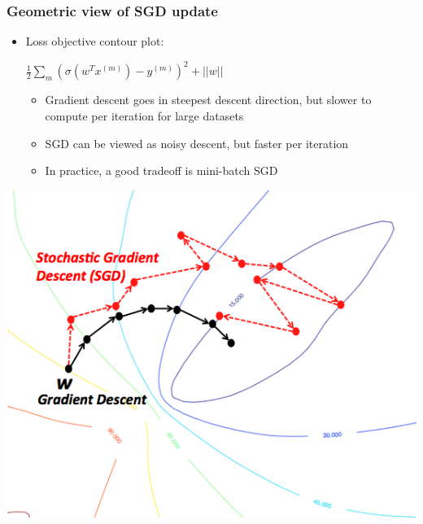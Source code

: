 \documentclass{beamer}
\newcommand{\bi}{\begin{itemize}}
\newcommand{\ei}{\end{itemize}}
\begin{document}
\begin{frame}
\frametitle{Geometric view of SGD update}
\bi
\item Loss objective contour plot: \begin{small}$\frac{1}{2} \sum_{m}  ( \sigma(w^T x^{(m)}) - y^{(m)} )^2 + ||w||$\end{small}
\bi
	\item Gradient descent goes in steepest descent direction, but slower to compute per iteration for large datasets
	\item SGD can be viewed as noisy descent, but faster per iteration
	\item In practice, a good tradeoff is mini-batch SGD
\ei
\ei
\centerline{\includegraphics[scale=0.4]{figs/sgd_contour}}
\end{frame}
\end{document}
